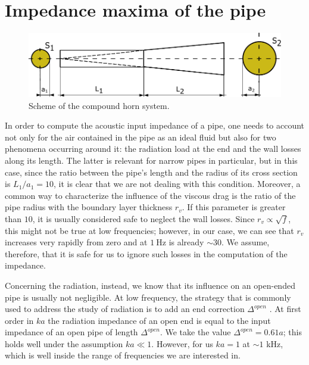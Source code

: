 \documentclass[a4paper]{article}
\begin{document}
\section{Impedance maxima of the pipe}

\begin{figure}[h!]
	\centering
	\includegraphics[width=0.8\linewidth]{diagramma.pdf}
	\caption{Scheme of the compound horn system.}
	\label{fig:diag}
\end{figure}

In order to compute the acoustic input impedance of a pipe, one needs to account not only for the air contained in the pipe as an ideal fluid but also for two phenomena occurring around it: the radiation load at the end and the wall losses along its length. The latter is relevant for narrow pipes in particular, but in this case, since the ratio between the pipe's length and the radius of its cross section is $L_1/a_1 = 10$, it is clear that we are not dealing with this condition. Moreover, a common way to characterize the influence of the viscous drag is the ratio of the pipe radius with the boundary layer thickness $r_v$. If this parameter is greater than $10$, it is usually considered safe to neglect the wall losses. Since $r_v \propto \sqrt{f} $, this might not be true at low frequencies; however, in our case, we can see that $r_v$ increases very rapidly from zero and at $\SI{1}{\hertz}$ is already $ \sim 30 $. We assume, therefore, that it is safe for us to ignore such losses in the computation of the impedance. 

Concerning the radiation, instead, we know that its influence on an open-ended pipe is usually not negligible. At low frequency, the strategy that is commonly used to address the study of radiation is to add an end correction $\Delta^{open}$ . At first order in $ka$ the radiation impedance of an open end is equal to the input impedance of an open pipe of length $\Delta^{open}$. We take the value $\Delta^{open} = 0.61 a$; this holds well under the assumption $ka \ll 1 $. However, for us $ka = 1$ at $\sim 1$ kHz, which is well inside the range of frequencies we are interested in.  
\end{document}
